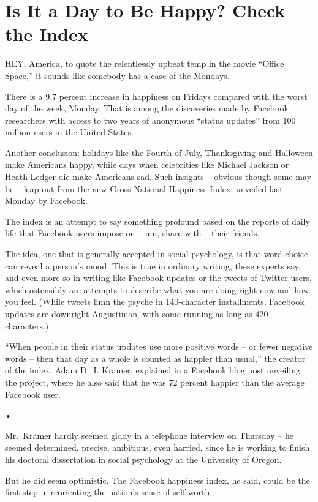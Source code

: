 ﻿\documentclass[12pt]{article}
\begin{document}
\section{Is It a Day to Be Happy? Check the Index}

\lettrine{H}{EY}, America, to quote the relentlessly upbeat temp in the
movie ``Office Space,'' it sounds like somebody has a case of the Mondays.

There is a 9.7 percent increase in happiness on Fridays compared with the worst day of the week,
Monday. That is among the discoveries made by Facebook researchers with access to two years of
anonymous ``status updates'' from 100 million users in the United States.

Another conclusion: holidays like the Fourth of July, Thanksgiving and Halloween make Americans
happy, while days when celebrities like Michael Jackson or Heath Ledger die make Americans sad. Such
insights -- obvious though some may be -- leap out from the new Gross National Happiness Index,
unveiled last Monday by Facebook.

The index is an attempt to say something profound based on the reports of daily life that Facebook
users impose on -- um, share with -- their friends.

The idea, one that is generally accepted in social psychology, is that word choice can reveal a
person's mood. This is true in ordinary writing, these experts say, and even more so in writing like
Facebook updates or the tweets of Twitter users, which ostensibly are attempts to describe what you
are doing right now and how you feel. (While tweets limn the psyche in 140-character installments,
Facebook updates are downright Augustinian, with some running as long as 420 characters.)

``When people in their status updates use more positive words -- or fewer negative words -- then
that day as a whole is counted as happier than usual,'' the creator of the index, Adam D.~I. Kramer,
explained in a Facebook blog post unveiling the project, where he also said that he was 72 percent
happier than the average Facebook user.

•

Mr.~Kramer hardly seemed giddy in a telephone interview on Thursday -- he seemed determined,
precise, ambitious, even harried, since he is working to finish his doctoral dissertation in social
psychology at the University of Oregon.

But he did seem optimistic. The Facebook happiness index, he said, could be the first step in
reorienting the nation's sense of self-worth.
\end{document}
